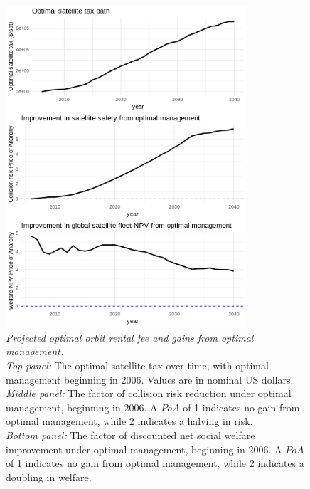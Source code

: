 \documentclass[12pt]{article}
\begin{document}
\begin{figure}[H]
	\centering
	\includegraphics[width=0.8\textwidth]{../../images/welfare_and_tax.png}
	\captionsetup{format=hang}
	\caption[Projected optimal orbit rental fee and gains from optimal management]{\textit{Projected optimal orbit rental fee and gains from optimal management.} \\
		\textit{Top panel:} The optimal satellite tax over time, with optimal management beginning in 2006. Values are in nominal US dollars. \\
		\textit{Middle panel:} The factor of collision risk reduction under optimal management, beginning in 2006. A $PoA$ of 1 indicates no gain from optimal management, while 2 indicates a halving in risk. \\
		\textit{Bottom panel:} The factor of discounted net social welfare improvement under optimal management, beginning in 2006. A $PoA$ of 1 indicates no gain from optimal management, while 2 indicates a doubling in welfare. \\
	}
	\label{projected_tax_path}
\end{figure}

\newpage

{
	\setlength{\bibsep}{3pt}
	
	
}
\end{document}
